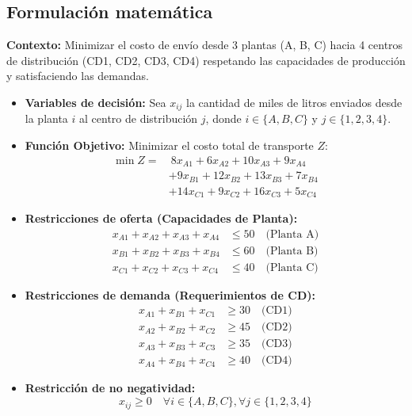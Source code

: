 \documentclass[12pt]{article}
\begin{document}
\subsection{Formulación matemática}
\textbf{Contexto:} Minimizar el costo de envío desde 3 plantas (A, B, C) hacia 4 centros de distribución (CD1, CD2, CD3, CD4) respetando las capacidades de producción y satisfaciendo las demandas.

\begin{itemize}
    \item \textbf{Variables de decisión:} 
    Sea $x_{ij}$ la cantidad de miles de litros enviados desde la planta $i$ al centro de distribución $j$, donde $i \in \{A, B, C\}$ y $j \in \{1, 2, 3, 4\}$.

    \item \textbf{Función Objetivo:}
    Minimizar el costo total de transporte $Z$:
    \begin{equation*}
    \begin{aligned}
    \min Z = & \ 8x_{A1} + 6x_{A2} + 10x_{A3} + 9x_{A4} \\
             & + 9x_{B1} + 12x_{B2} + 13x_{B3} + 7x_{B4} \\
             & + 14x_{C1} + 9x_{C2} + 16x_{C3} + 5x_{C4}
    \end{aligned}
    \end{equation*}

    \item \textbf{Restricciones de oferta (Capacidades de Planta):}
    \begin{align*}
    x_{A1} + x_{A2} + x_{A3} + x_{A4} & \leq 50 \quad \text{(Planta A)} \\
    x_{B1} + x_{B2} + x_{B3} + x_{B4} & \leq 60 \quad \text{(Planta B)} \\
    x_{C1} + x_{C2} + x_{C3} + x_{C4} & \leq 40 \quad \text{(Planta C)}
    \end{align*}

    \item \textbf{Restricciones de demanda (Requerimientos de CD):}
    \begin{align*}
    x_{A1} + x_{B1} + x_{C1} & \geq 30 \quad \text{(CD1)} \\
    x_{A2} + x_{B2} + x_{C2} & \geq 45 \quad \text{(CD2)} \\
    x_{A3} + x_{B3} + x_{C3} & \geq 35 \quad \text{(CD3)} \\
    x_{A4} + x_{B4} + x_{C4} & \geq 40 \quad \text{(CD4)}
    \end{align*}

    \item \textbf{Restricción de no negatividad:}
    \begin{equation*}
    x_{ij} \geq 0 \quad \forall i \in \{A, B, C\}, \forall j \in \{1, 2, 3, 4\}
    \end{equation*}
\end{itemize}
\end{document}
